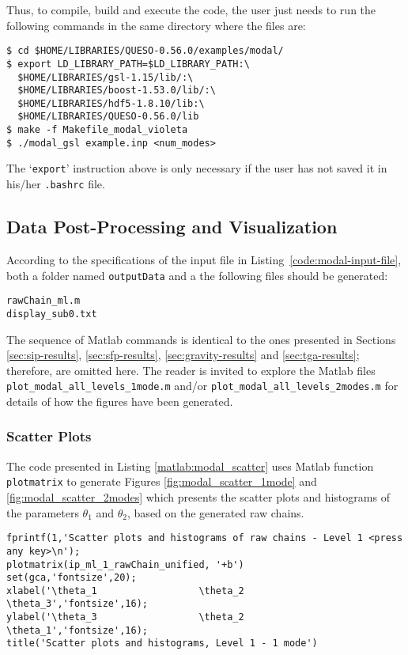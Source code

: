 Thus, to compile, build and execute the code, the user just needs to run the following commands in the same directory where the files are:
\begin{lstlisting}
$ cd $HOME/LIBRARIES/QUESO-0.56.0/examples/modal/
$ export LD_LIBRARY_PATH=$LD_LIBRARY_PATH:\
  $HOME/LIBRARIES/gsl-1.15/lib/:\
  $HOME/LIBRARIES/boost-1.53.0/lib/:\
  $HOME/LIBRARIES/hdf5-1.8.10/lib:\
  $HOME/LIBRARIES/QUESO-0.56.0/lib
$ make -f Makefile_modal_violeta
$ ./modal_gsl example.inp <num_modes>
\end{lstlisting}

The `\verb+export+' instruction above is only necessary if the user has not saved it in his/her \verb+.bashrc+ file.


\subsection{Data Post-Processing and Visualization}\label{sec:modal-results}



According to the specifications of the input file in Listing~\ref{code:modal-input-file}, both a folder named \verb+outputData+ and a the following files should be generated:
\begin{verbatim}
rawChain_ml.m
display_sub0.txt
\end{verbatim}


The sequence of Matlab commands is identical to the ones presented in Sections
\ref{sec:sip-results}, \ref{sec:sfp-results}, \ref{sec:gravity-results} and \ref{sec:tga-results};
therefore, are omitted here. The reader is invited to explore the Matlab files
\texttt{plot\_modal\_all\_levels\_1mode.m}  and/or \texttt{plot\_modal\_all\_levels\_2modes.m}
for details of how the figures have been generated.


\subsubsection{Scatter Plots}

The code presented in Listing \ref{matlab:modal_scatter} uses Matlab function \verb+plotmatrix+ to generate Figures \ref{fig:modal_scatter_1mode} and \ref{fig:modal_scatter_2modes}
which presents the scatter plots and histograms of the parameters $\theta_1$ and $\theta_2$, based on the generated raw chains.


\begin{lstlisting}[label=matlab:modal_scatter,caption={Matlab code for the scatter plots depicted in Figures \ref{fig:modal_scatter_1mode} and \ref{fig:modal_scatter_2modes}.}]
fprintf(1,'Scatter plots and histograms of raw chains - Level 1 <press any key>\n');
plotmatrix(ip_ml_1_rawChain_unified, '+b')
set(gca,'fontsize',20);
xlabel('\theta_1                  \theta_2                   \theta_3','fontsize',16);
ylabel('\theta_3                  \theta_2                   \theta_1','fontsize',16);
title('Scatter plots and histograms, Level 1 - 1 mode')
\end{lstlisting}

